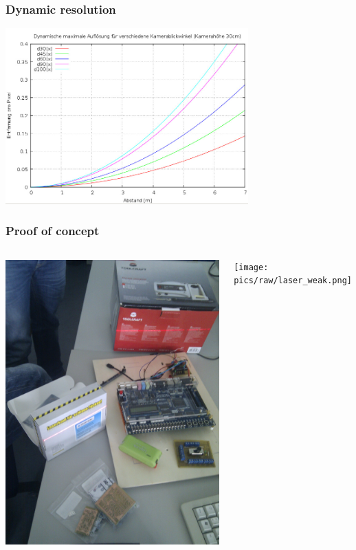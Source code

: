 \documentclass[pdf]{beamer}
\begin{document}
\begin{frame}
\frametitle{Dynamic resolution}
  \begin{center}
  \includegraphics[width = 0.7\textwidth]{pics/raw/scanner_aufloesung.png}
  \end{center}
\end{frame}

\begin{frame}
\frametitle{Proof of concept}
  \begin{columns}
  \begin{center}
  \includegraphics[width = \textwidth]{pics/raw/laser_test.jpg}
  \end{center}
  \begin{center}
  \texttt{[image: pics/raw/laser\_weak.png]}
  \end{center}
  \end{columns}
\end{frame}
\end{document}

